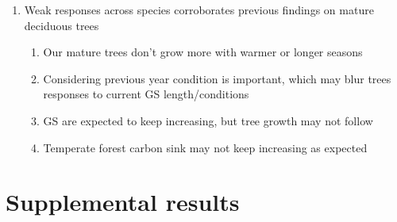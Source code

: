 \begin{enumerate}
\begin{enumerate}
  \item {\Ball} trend suggests that warmer conditions in previous year increases growth, but current decreases
  
  \item Points towards allocation strategy that prioritize storage before growth---expected with conservative species
  
  \item {\Bnig} increases in the current year, but only when previous year is included
  
  \item This highlights the importance of considering not only the current year conditions
  
  \end{enumerate}

\item Weak responses across species corroborates previous findings on mature deciduous trees
  \begin{enumerate}
  \item Our mature trees don't grow more with warmer or longer seasons 
  
  \item Considering previous year condition is important, which may blur trees responses to current GS length/conditions
  
  \item GS are expected to keep increasing, but tree growth may not follow
  
  \item Temperate forest carbon sink may not keep increasing as expected
  
  \end{enumerate}
  
\end{enumerate}


\clearpage
\clearpage
\section*{Supplemental results}

\setcounter{table}{0}
\renewcommand{\thetable}{S\arabic{table}}
\setcounter{figure}{0}
\renewcommand{\thefigure}{S\arabic{figure}}


